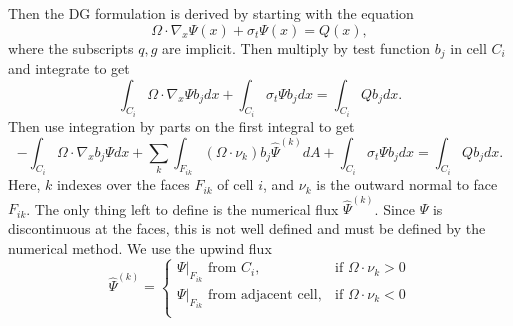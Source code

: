 \documentclass[12pt,letterpaper]{article}
\begin{document}
Then the DG formulation is derived by starting with the equation
\begin{equation} \label{eq:sweep}
\Omega \cdot \nabla_x \Psi(x) + \sigma_t \Psi(x) = Q(x),
\end{equation}
where the subscripts $q,g$ are implicit.
Then multiply by test function $b_j$ in cell $C_i$ and integrate to get
\begin{equation}
\int_{C_i} \Omega \cdot \nabla_x \Psi b_j dx + \int_{C_i} \sigma_t \Psi b_j dx = \int_{C_i} Q b_j dx.
\end{equation}
Then use integration by parts on the first integral to get
\begin{equation}
-\int_{C_i} \Omega \cdot \nabla_x b_j \Psi dx + 
\sum_k \int_{F_{ik}} (\Omega \cdot \nu_k) b_j \hat{\Psi}^{(k)} dA + 
\int_{C_i} \sigma_t \Psi b_j dx = \int_{C_i} Q b_j dx.
\end{equation}
Here, $k$ indexes over the faces $F_{ik}$ of cell $i$, and $\nu_k$ is the outward normal to face $F_{ik}$.
The only thing left to define is the numerical flux $\hat{\Psi}^{(k)}$.
Since $\Psi$ is discontinuous at the faces, this is not well defined and must be defined by the numerical method.
We use the upwind flux
\begin{equation}
\hat{\Psi}^{(k)} = \begin{cases}
\Psi|_{F_{ik}} \textrm{ from } C_{i}, & \textrm{if } \Omega \cdot \nu_k > 0 \\
\Psi|_{F_{ik}} \textrm{ from adjacent cell} , & \textrm{if } \Omega \cdot \nu_k < 0 \\
\end{cases}
\end{equation}
\end{document}
